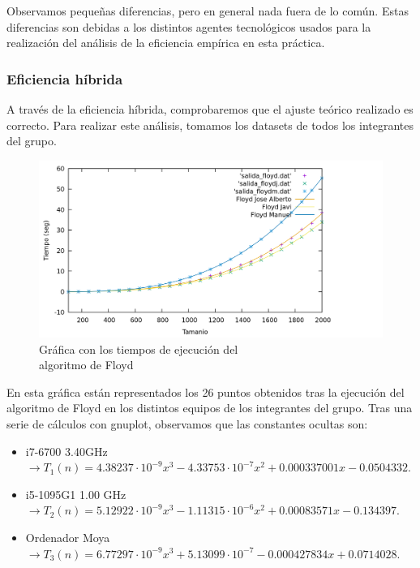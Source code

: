 \documentclass[10pt,a4paper]{article}
\begin{document}
Observamos pequeñas diferencias, pero en general nada fuera de lo común. Estas diferencias son debidas a los distintos agentes tecnológicos usados para la realización del análisis de la eficiencia empírica en esta práctica.

\subsubsection{Eficiencia híbrida}

A través de la eficiencia híbrida, comprobaremos que el ajuste teórico realizado es correcto. Para realizar este análisis, tomamos los datasets de todos los integrantes del grupo. \\

\begin{figure}[h!]
\centering
\includegraphics[scale=0.15]{../../Images/floyd_combinados.png}
\caption{Gráfica con los tiempos de ejecución del \\algoritmo de Floyd}
\end{figure}

En esta gráfica están representados los 26 puntos obtenidos tras la ejecución del algoritmo de Floyd en los distintos equipos de los integrantes del grupo. Tras una serie de cálculos con gnuplot, observamos que las constantes ocultas son:
\begin{itemize}
	\item i7-6700 3.40GHz \(\rightarrow T_1(n) = 4.38237 \cdot 10^{-9} x^3 -4.33753 \cdot 10^{-7} x^2 + 0.000337001 x -0.0504332\).
	\item i5-1095G1 1.00 GHz \(\rightarrow T_2(n) = 5.12922 \cdot 10^{-9} x^3 -1.11315 \cdot 10^{-6} x^2 + 0.00083571 x - 0.134397\).
	\item Ordenador Moya \(\rightarrow T_3(n) = 6.77297 \cdot 10^{-9} x^3 + 5.13099 \cdot 10^{-7} - 0.000427834 x + 0.0714028\).
\end{itemize} 
\end{document}
